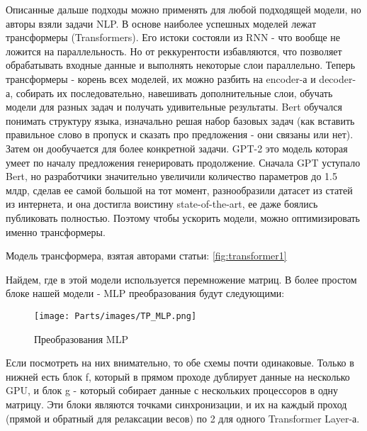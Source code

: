 Описанные дальше подходы можно применять для любой подходящей модели, но авторы взяли задачи NLP. В основе наиболее успешных моделей лежат трансформеры (Transformers). Его истоки состояли из RNN - что вообще не ложится на параллельность. Но \cite{vaswani2017attention} от реккурентости избавляются, что позволяет обрабатывать входные данные и выполнять некоторые слои параллельно. Теперь трансформеры - корень всех моделей, их можно разбить на encoder-а и decoder-а, собирать их последовательно, навешивать дополнительные слои, обучать модели для разных задач и получать удивительные результаты. Bert обучался понимать структуру языка, изначально решая набор базовых задач (как вставить правильное слово в пропуск и сказать про предложения - они связаны или нет). Затем он дообучается для более конкретной задачи. GPT-2 это модель которая умеет по началу предложения генерировать продолжение. Сначала GPT уступало Bert, но разработчики значительно увеличили количество параметров до 1.5 млдр, сделав ее самой большой на тот момент, разнообразили датасет из статей из интернета, и она достигла воистину state-of-the-art, ее даже боялись публиковать полностью. Поэтому чтобы ускорить модели, можно оптимизировать именно трансформеры.

Модель трансформера, взятая авторами статьи: \ref{fig:transformer1}


Найдем, где в этой модели используется перемножение матриц. В более простом блоке нашей модели - MLP преобразования будут следующими:

\begin{figure}[H]
    \centering
    \texttt{[image: Parts/images/TP\_MLP.png]}
    \caption{Преобразования MLP}
\end{figure}

Если посмотреть на них внимательно, то обе схемы почти одинаковые. Только в нижней есть блок f, который в прямом проходе дублирует данные на несколько GPU, и блок g - который собирает данные с нескольких процессоров в одну матрицу. Эти блоки являются точками синхронизации, и их на каждый проход (прямой и обратный для релаксации весов) по 2 для одного Transformer Layer-а. 


